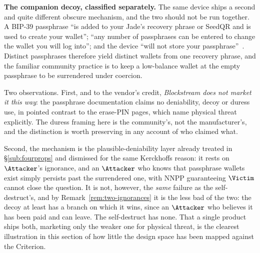 \medskip\noindent\textbf{The companion decoy, classified separately.} The same
device ships a second and quite different obscure mechanism, and the two should
not be run together. A BIP-39 passphrase ``is added to your Jade's
recovery phrase or SeedQR and is used to create your wallet''; ``any number of
passphrases can be entered to change the wallet you will log into''; and the
device ``will not store your passphrase''~\cite{jade-passphrase}. Distinct
passphrases therefore yield distinct wallets from one recovery phrase, and the
familiar community practice is to keep a low-balance wallet at the empty
passphrase to be surrendered under coercion.

Two observations. First, and to the vendor's credit, \emph{Blockstream does not
market it this way}: the passphrase documentation claims no deniability, decoy
or duress use, in pointed contrast to the erase-PIN pages, which name physical
threat explicitly. The duress framing here is the community's,
not the manufacturer's, and the distinction is worth preserving in any account of
who claimed what.

Second, the mechanism is the plausible-deniability layer already treated in
\S\ref{sub:fourprops} and dismissed for the same Kerckhoffs reason: it rests on
$\Attacker$'s ignorance, and an $\Attacker$ who knows that passphrase wallets
exist simply persists past the surrendered one, with NNPP guaranteeing $\Victim$
cannot close the question. It is not, however, the \emph{same} failure as the
self-destruct's, and by Remark~\ref{rem:two-ignorances} it is the less bad of the
two: the decoy at least has a branch on which it wins, since an $\Attacker$ who
believes it has been paid and can leave. The self-destruct has none. That a
single product ships both, marketing only the weaker one for physical threat, is
the clearest illustration in this section of how little the design space has been
mapped against the Criterion.

